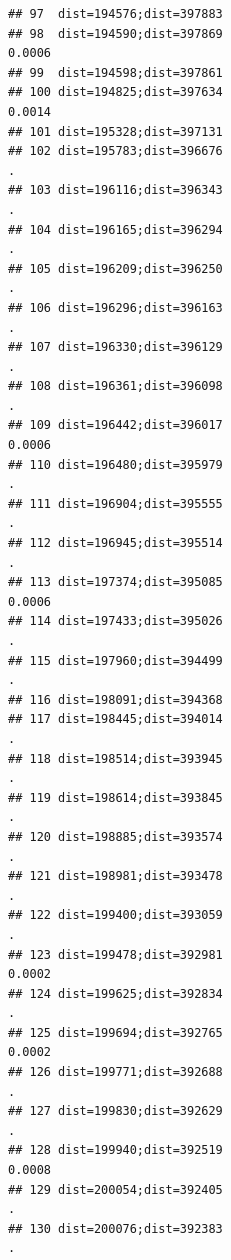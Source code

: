 \documentclass[
]{article}
\begin{document}
\begin{verbatim}
## 97  dist=194576;dist=397883                                               
## 98  dist=194590;dist=397869                                         0.0006
## 99  dist=194598;dist=397861                                               
## 100 dist=194825;dist=397634                                         0.0014
## 101 dist=195328;dist=397131                                               
## 102 dist=195783;dist=396676                                              .
## 103 dist=196116;dist=396343                                              .
## 104 dist=196165;dist=396294                                              .
## 105 dist=196209;dist=396250                                              .
## 106 dist=196296;dist=396163                                              .
## 107 dist=196330;dist=396129                                              .
## 108 dist=196361;dist=396098                                              .
## 109 dist=196442;dist=396017                                         0.0006
## 110 dist=196480;dist=395979                                              .
## 111 dist=196904;dist=395555                                              .
## 112 dist=196945;dist=395514                                              .
## 113 dist=197374;dist=395085                                         0.0006
## 114 dist=197433;dist=395026                                              .
## 115 dist=197960;dist=394499                                              .
## 116 dist=198091;dist=394368                                               
## 117 dist=198445;dist=394014                                              .
## 118 dist=198514;dist=393945                                              .
## 119 dist=198614;dist=393845                                              .
## 120 dist=198885;dist=393574                                              .
## 121 dist=198981;dist=393478                                              .
## 122 dist=199400;dist=393059                                              .
## 123 dist=199478;dist=392981                                         0.0002
## 124 dist=199625;dist=392834                                              .
## 125 dist=199694;dist=392765                                         0.0002
## 126 dist=199771;dist=392688                                              .
## 127 dist=199830;dist=392629                                              .
## 128 dist=199940;dist=392519                                         0.0008
## 129 dist=200054;dist=392405                                              .
## 130 dist=200076;dist=392383                                              .

\end{verbatim}
\end{document}
